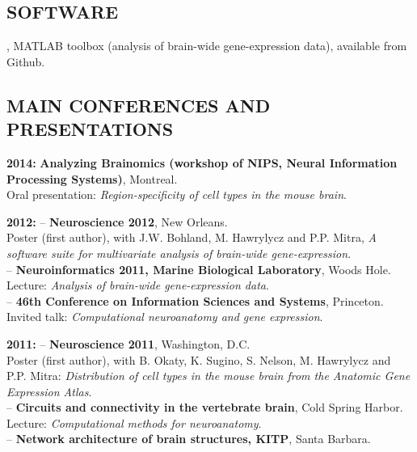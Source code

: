 \documentclass[a4paper, 12pt]{scrartcl}
\newcommand{\confSpace}{\vspace{-0.25in}}
\begin{document}
\subsection*{ \sc\bf SOFTWARE}
\vspace{-0.10in}
{}, MATLAB toolbox (analysis of brain-wide gene-expression data), available from Github.
\newpage
\subsection*{\sc\bf MAIN CONFERENCES AND PRESENTATIONS}
\vspace{-0.05in}
\begin{list}{name}{ 8em \leftmargin .606 in \itemsep 0.01in}
 \item [\bf 2014: ] {\bf{Analyzing Brainomics (workshop of NIPS, Neural Information Processing Systems)}}, Montreal.\\ 
 Oral presentation: {\emph{Region-specificity of cell types in the mouse brain}}.\\
\confSpace
 \item [\bf 2012: ]
-- {\bf Neuroscience 2012}, New Orleans.\\ 
  Poster (first author), with J.W. Bohland, M. Hawrylycz and P.P. Mitra, {\emph{A software suite for multivariate analysis of brain-wide gene-expression}}.\\ 
-- {\bf Neuroinformatics 2011, Marine Biological Laboratory}, Woods Hole.\\ 
Lecture: {\em{Analysis of brain-wide gene-expression data}}.\\
-- {\bf 46th Conference on Information Sciences and Systems}, Princeton.\\
 Invited talk: {\emph{Computational neuroanatomy and gene expression}}.\\
\confSpace
 \item [\bf 2011: ] 
-- {\bf Neuroscience 2011}, Washington, D.C.\\
   Poster (first author), with B. Okaty, K. Sugino, S. Nelson, M. Hawrylycz and P.P. Mitra:
 {\emph{Distribution of cell types in the mouse brain from the Anatomic Gene Expression Atlas}}.\\
-- {\bf Circuits and connectivity in the vertebrate brain}, Cold Spring Harbor.\\
 Lecture: {\em{Computational methods for neuroanatomy}}.\\
-- {\bf Network architecture of brain structures, KITP}, Santa Barbara.\\

\end{list}
\end{document}
